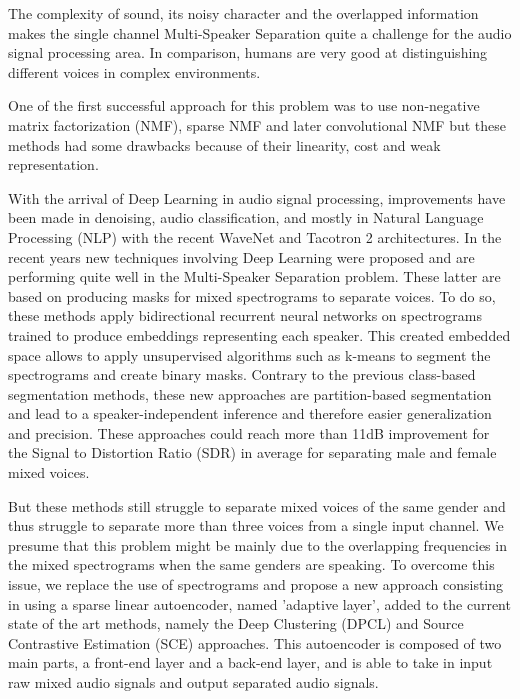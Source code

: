 \documentclass[master, tikz, final,11pt, dvipdfmx]{iscs-thesis}
\date{July 11, 2018}
\begin{document}
\begin{eabstract}

The complexity of sound, its noisy character and the overlapped information makes the single channel Multi-Speaker Separation quite a challenge for the audio signal processing area. In comparison, humans are very good at distinguishing different voices in complex environments.

One of the first successful approach for this problem was to use non-negative matrix factorization (NMF), sparse NMF and later convolutional NMF but these methods had some drawbacks because of their linearity, cost and weak representation.

With the arrival of Deep Learning in audio signal processing, improvements have been made in denoising, audio classification, and mostly in Natural Language Processing  (NLP) with the recent WaveNet and Tacotron 2 architectures. In the recent years new techniques involving Deep Learning were proposed and are performing quite well in the Multi-Speaker Separation problem. These latter are based on producing masks for mixed spectrograms to separate voices. To do so, these methods apply bidirectional recurrent neural networks on spectrograms trained to produce embeddings representing each speaker. This created embedded space allows to apply unsupervised algorithms such as k-means to segment the spectrograms and create binary masks. Contrary to the previous class-based segmentation methods, these new approaches are partition-based segmentation and lead to a speaker-independent inference and therefore easier generalization and precision. These approaches could reach more than 11dB improvement for the Signal to Distortion Ratio (SDR) in average for separating male and female mixed voices.

But these methods still struggle to separate mixed voices of the same gender and thus struggle to separate more than three voices from a single input channel. We presume that this problem might be mainly due to the overlapping frequencies in the mixed spectrograms when the same genders are speaking. To overcome this issue, we replace the use of spectrograms and propose a new approach consisting in using a sparse linear autoencoder, named 'adaptive layer', added to the current state of the art methods, namely the Deep Clustering (DPCL) and Source Contrastive Estimation (SCE) approaches. This autoencoder is composed of two main parts, a front-end layer and a back-end layer, and is able to take in input raw mixed audio signals and output separated audio signals. 


\end{eabstract}
\end{document}
